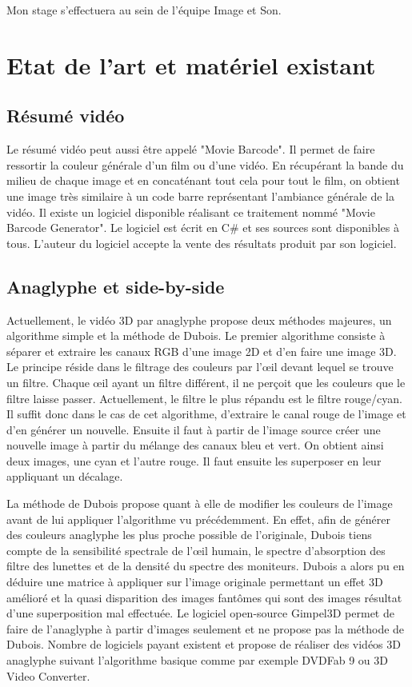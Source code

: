 \documentclass[10pt,a4paper]{article}
\begin{document}
Mon stage s'effectuera au sein de l'équipe Image et Son.

\section{Etat de l'art et matériel existant}
\subsection{Résumé vidéo}
Le résumé vidéo peut aussi être appelé "Movie Barcode". Il permet de faire ressortir la couleur générale d'un film ou d'une vidéo. En récupérant la bande du milieu de chaque image et en concaténant tout cela pour
tout le film, on obtient une image très similaire à un code barre représentant l'ambiance générale de la vidéo.
Il existe un logiciel disponible réalisant ce traitement nommé "Movie Barcode Generator". Le logiciel est écrit en C\# et ses sources sont disponibles à tous\cite{barcode}. L'auteur du logiciel accepte la vente des
résultats produit par son logiciel.

\subsection{Anaglyphe et side-by-side}
\label{anasbs}
Actuellement, le vidéo 3D par anaglyphe propose deux méthodes majeures, un algorithme simple et la méthode de Dubois.
Le premier algorithme consiste à séparer et extraire les canaux RGB d'une image 2D et d'en faire une image 3D. Le principe réside dans le filtrage des couleurs par l'œil devant lequel se trouve un filtre.
Chaque œil ayant un filtre différent, il ne perçoit que les couleurs que le filtre laisse passer. Actuellement, le filtre le plus répandu est le filtre rouge/cyan.
Il suffit donc dans le cas de cet algorithme, d'extraire le canal rouge de l'image et d'en générer un nouvelle. Ensuite il faut à partir de l'image source créer une nouvelle image à partir du mélange des canaux bleu et vert.
On obtient ainsi deux images, une cyan et l'autre rouge. Il faut ensuite les superposer en leur appliquant un décalage.\newline

La méthode de Dubois propose quant à elle de modifier les couleurs de l'image avant de lui appliquer l'algorithme vu précédemment.
En effet, afin de générer des couleurs anaglyphe les plus proche possible de l'originale, Dubois tiens compte de la sensibilité spectrale de l'œil humain,
le spectre d'absorption des filtre des lunettes et de la densité du spectre des moniteurs\cite{dubois}.
Dubois a alors pu en déduire une matrice à appliquer sur l'image originale permettant un effet 3D amélioré et la quasi
disparition des images fantômes qui sont des images résultat d'une superposition mal effectuée.
Le logiciel open-source Gimpel3D permet de faire de l'anaglyphe à partir d'images seulement et ne propose pas la méthode de Dubois. Nombre de logiciels payant existent et propose de réaliser des vidéos 3D
anaglyphe suivant l'algorithme basique comme par exemple DVDFab 9 ou  3D Video Converter.\newline
\end{document}
